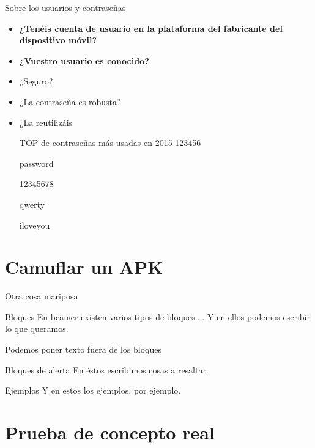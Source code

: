 \documentclass{beamer}
\begin{document}
\begin{frame}{Sobre los usuarios y contraseñas}
	
	\begin{itemize}[<+-|alert@+>]
		
		\item \textbf{¿Tenéis cuenta de usuario en la plataforma del fabricante del dispositivo móvil?}
		\item \textbf{¿Vuestro usuario es conocido?}
		\item ¿Seguro?
		\item ¿La contraseña es robusta?
		\item ¿La reutilizáis
		
	\begin{block}{TOP de contraseñas más usadas en 2015}
		123456
		
		password
		
		12345678
		
		qwerty
		
		iloveyou
		
	\end{block}
	
	\end{itemize}
	
\end{frame}


\section{Camuflar un APK}

\begin{frame}{Otra cosa mariposa}
\begin{block}{Bloques}
En beamer existen varios tipos de bloques....
Y en ellos podemos escribir lo que queramos.
\end{block}

Podemos poner texto fuera de los bloques

\begin{alertblock}{Bloques de alerta}
En éstos escribimos cosas a resaltar.
\end{alertblock}

\begin{exampleblock}{Ejemplos}
Y en estos los ejemplos, por ejemplo.
\end{exampleblock}

\end{frame}

\section{Prueba de concepto real}
\end{document}
